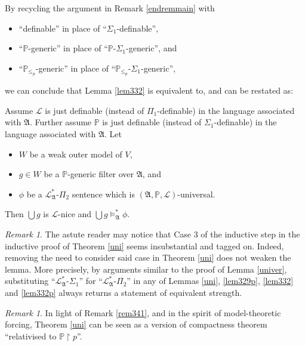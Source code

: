 \documentclass[12pt, twoside]{memoir}
\numberwithin{equation}{section}
\theoremstyle{definition}
\theoremstyle{remark}
\newtheorem{rem}[thm]{Remark}
\theoremstyle{definition}
\theoremstyle{definition}
\newenvironment{customlem}[1]
  {\renewcommand\theinnercustomlem{#1}\innercustomlem}
  {\endinnercustomlem}
\theoremstyle{definition}
\theoremstyle{remark}
\begin{document}
By recycling the argument in Remark \ref{endremmain} with 
\begin{itemize}
    \item ``definable'' in place of ``$\Sigma_1$-definable'', 
    \item ``$\mathbb{P}$-generic'' in place of ``$\mathbb{P}$-$\Sigma_1$-generic'', and
    \item ``$\mathbb{P}_{\leq_p}$-generic'' in place of ``$\mathbb{P}_{\leq_p}$-$\Sigma_1$-generic'',
\end{itemize}
we can conclude that Lemma \ref{lem332} is equivalent to, and can be restated as:

\begin{customlem}{3.2.13$'$}\label{lem332p}
Assume $\mathcal{L}$ is just definable (instead of $\Pi_1$-definable) in the language associated with $\mathfrak{A}$. Further assume $\mathbb{P}$ is just definable (instead of $\Sigma_1$-definable) in the language associated with $\mathfrak{A}$. Let 
\begin{itemize} 
    \item $W$ be a weak outer model of $V$,
    \item $g \in W$ be a $\mathbb{P}$-generic filter over $\mathfrak{A}$, and
    \item $\phi$ be a $\mathcal{L}^{*}_{\mathfrak{A}}$-$\Pi_2$ sentence which is $(\mathfrak{A}, \mathbb{P}, \mathcal{L})$-universal.
\end{itemize} 
Then $\bigcup g$ is $\mathcal{L}$-nice and $\bigcup g \models^{*}_{\mathfrak{A}} \phi$.
\end{customlem}

\begin{rem}\label{rem333}
The astute reader may notice that Case 3 of the inductive step in the inductive proof of Theorem \ref{uni} seems insubstantial and tagged on. Indeed, removing the need to consider said case in Theorem \ref{uni} does not weaken the lemma. More precisely, by arguments similar to the proof of Lemma \ref{univer}, substituting ``$\mathcal{L}^{*}_{\mathfrak{A}}$-$\Sigma_1$'' for ``$\mathcal{L}^{*}_{\mathfrak{A}}$-$\Pi_2$'' in any of Lemmas \ref{uni}, \ref{lem329p}, \ref{lem332} and \ref{lem332p} always returns a statement of equivalent strength.
\end{rem}

\begin{rem}
In light of Remark \ref{rem341}, and in the spirit of model-theoretic forcing, Theorem \ref{uni} can be seen as a version of compactness theorem ``relativised to $\mathbb{P} \restriction p$''.
\end{rem}
\end{document}

